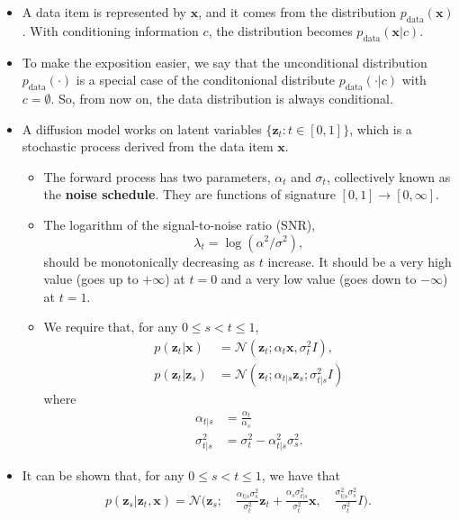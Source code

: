 \documentclass[10pt]{article}
\newcommand{\ve}[1]{\mathbf{#1}}
\newcommand{\mcal}[1]{\mathcal{#1}}
\newcommand{\data}{\mathrm{data}}
\begin{document}
\begin{itemize}
  \item A data item is represented by $\ve{x}$, and it comes from the distribution $p_{\data}(\ve{x})$. With conditioning information $c$, the distribution becomes $p_{\data}(\ve{x}|c)$.
  
  \item To make the exposition easier, we say that the unconditional distribution $p_{\data}(\cdot)$ is a special case of the conditonional distribute $p_{\data}(\cdot|c)$ with $c = \emptyset$. So, from now on, the data distribution is always conditional.
  
  \item A diffusion model works on latent variables $\{ \ve{z}_t : t \in [0,1] \}$, which is a stochastic process derived from the data item $\ve{x}$.
  \begin{itemize}
    \item The forward process has two parameters, $\alpha_t$ and $\sigma_t$, collectively known as the {\bf noise schedule}. They are functions of signature $[0,1] \rightarrow [0,\infty]$.
    
    \item The logarithm of the signal-to-noise ratio (SNR), $$\lambda_t = \log(\alpha^2/\sigma^2),$$ should be monotonically decreasing as $t$ increase. It should be a very high value (goes up to $+\infty$) at $t=0$ and a very low value (goes down to $-\infty$) at $t=1$.
    
    \item We require that, for any $0 \leq s < t \leq 1$,
    \begin{align*}
      p(\ve{z}_t|\ve{x}) &= \mcal{N}(\ve{z}_t; \alpha_t \ve{x}, \sigma_t^2 I), \\
      p(\ve{z}_t|\ve{z}_s) &= \mcal{N}(\ve{z}_t ; \alpha_{t|s} \ve{z}_s ; \sigma_{t|s}^2 I)
    \end{align*}
    where
    \begin{align*}
      \alpha_{t|s} &= \frac{\alpha_t}{\alpha_s} \\
      \sigma_{t|s}^2 &= \sigma_t^2 - \alpha_{t|s}^2 \sigma_s^2.
    \end{align*}
  \end{itemize}
  
  \item It can be shown that, for any $0 \leq s < t \leq 1$, we have that
  \begin{align*}
    p(\ve{z}_s | \ve{z}_t, \ve{x}) = \mcal{N}\bigg( \ve{z}_s ;\quad \frac{\alpha_{t|s}\sigma_s^2}{\sigma_t^2} \ve{z}_t + \frac{\alpha_s \sigma_{t|s}^2}{\sigma_t^2} \ve{x},\quad \frac{\sigma^2_{t|s}\sigma_s^2}{\sigma_t^2}  I \bigg).
  \end{align*}


\end{itemize}
\end{document}
